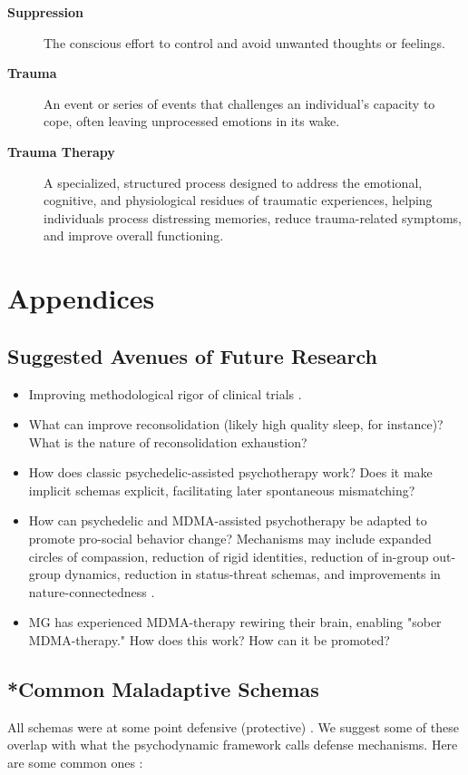 \documentclass[12pt,letterpaper]{article}
\begin{document}
\begin{description}
    \item[\textbf{Suppression}] The conscious effort to control and avoid unwanted thoughts or feelings.
    \item[\textbf{Trauma}] An event or series of events that challenges an individual's capacity to cope, often leaving unprocessed emotions in its wake.
    \item[\textbf{Trauma Therapy}] A specialized, structured process designed to address the emotional, cognitive, and physiological residues of traumatic experiences, helping individuals process distressing memories, reduce trauma-related symptoms, and improve overall functioning.
\end{description}
\appendix
\section{Appendices}
\subsection{Suggested Avenues of Future Research}
\begin{itemize}
    \item Improving methodological rigor of clinical trials \cite{adayMethodologicalRigor}.
    \item What can improve reconsolidation (likely high quality sleep, for instance)? What is the nature of reconsolidation exhaustion?
    \item How does classic psychedelic-assisted psychotherapy work? Does it make implicit schemas explicit, facilitating later spontaneous mismatching?
    \item How can psychedelic and MDMA-assisted psychotherapy be adapted to promote pro-social behavior change? Mechanisms may include expanded circles of compassion, reduction of rigid identities, reduction of in-group out-group dynamics, reduction in status-threat schemas, and improvements in nature-connectedness \cite{forstmannPsilocybinNature}.
    \item MG has experienced MDMA-therapy rewiring their brain, enabling "sober MDMA-therapy." How does this work? How can it be promoted?
\end{itemize}
\subsection{*Common Maladaptive Schemas}
\label{ref:defenses}
All schemas were at some point defensive (protective) \cite{eckerUnlocking}. We suggest some of these overlap with what the psychodynamic framework calls defense mechanisms. Here are some common ones \cite{vaillantAdaptation}:
\end{document}
